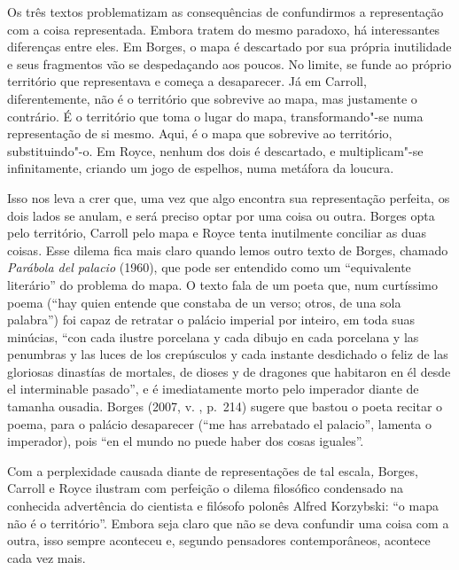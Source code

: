 Os três textos problematizam as consequências de confundirmos a
representação com a coisa representada. Embora tratem do mesmo paradoxo,
há interessantes diferenças entre eles. Em Borges, o mapa é descartado
por sua própria inutilidade e seus fragmentos vão se despedaçando aos
poucos. No limite, se funde ao próprio território que representava e
começa a desaparecer. Já em Carroll, diferentemente, não é o território
que sobrevive ao mapa, mas justamente o contrário. É o território que
toma o lugar do mapa, transformando"-se numa representação de si
mesmo. Aqui, é o mapa que sobrevive ao território, substituindo"-o. Em
Royce, nenhum dos dois é descartado, e multiplicam"-se infinitamente,
criando um jogo de espelhos, numa metáfora da loucura.

Isso nos leva a crer que, uma vez que algo encontra sua representação
perfeita, os dois lados se anulam, e será preciso optar por uma coisa ou
outra. Borges opta pelo território, Carroll pelo mapa e Royce tenta
inutilmente conciliar as duas coisas. Esse dilema fica mais claro quando
lemos outro texto de Borges, chamado \emph{Parábola del palacio} (1960),
que pode ser entendido como um ``equivalente literário'' do problema do
mapa. O texto fala de um poeta que, num curtíssimo poema (``hay quien
entende que constaba de un verso; otros, de una sola palabra'') foi
capaz de retratar o palácio imperial por inteiro, em toda suas minúcias,
``con cada ilustre porcelana y cada dibujo en cada porcelana y las
penumbras y las luces de los crepúsculos y cada instante desdichado o
feliz de las gloriosas dinastías de mortales, de dioses y de dragones
que habitaron en él desde el interminable pasado'', e é imediatamente
morto pelo imperador diante de tamanha ousadia. Borges (2007, v. , p.~214) sugere que bastou o poeta recitar o poema, para o palácio
desaparecer (``me has arrebatado el palacio'', lamenta o imperador),
pois ``en el mundo no puede haber dos cosas iguales''.

Com a perplexidade causada diante de representações de tal
escala\emph{,} Borges, Carroll e Royce ilustram com perfeição o dilema
filosófico condensado na conhecida advertência do cientista e filósofo
polonês Alfred Korzybski: ``o mapa não é o território''. Embora seja
claro que não se deva confundir uma coisa com a outra, isso sempre
aconteceu e, segundo pensadores contemporâneos, acontece cada vez mais.

